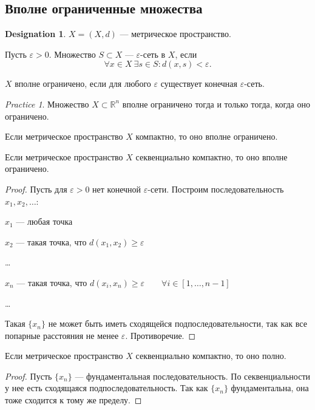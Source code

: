 \documentclass[11pt]{book}
\newcommand{\R}{\mathbb{R}}
\renewcommand{\ge}{\geqslant}
\theoremstyle{definition}
\theoremstyle{plain}
\theoremstyle{plain}
\theoremstyle{definition}
\newtheorem*{name}{Designation}
\theoremstyle{remark}
\newtheorem*{prac}{Practice}
\begin{document}
\subsection{Вполне ограниченные множества}
\begin{name}
    $ X = (X, d)$ --- метрическое пространство.
\end{name}
\begin{defn}
    Пусть $ \varepsilon >0$. Множество $ S \subset X$ --- $ \varepsilon $-сеть в $ X$, если
    \[
	\forall x \in X~ \exists s \in S: d(x, s)< \varepsilon
    .\]
\end{defn}
\begin{defn}
    $ X$ вполне ограничено, если для любого  $ \varepsilon $ существует конечная $ \varepsilon $-сеть.
\end{defn}
\begin{prac}
    Множество $ X \subset \R^{n} $ вполне ограничено тогда и только тогда, когда оно ограничено.
\end{prac}
\begin{thm}\label{th_comp_to_vpolne_ogran}
    Если метрическое пространство  $ X$ компактно, то оно вполне ограничено.
\end{thm}
\begin{thm}\label{th_sec_ogr}
    Если метрическое пространство $ X$ секвенциально компактно, то оно вполне ограничено.
\end{thm}
\begin{proof}
    Пусть для $ \varepsilon > 0$ нет конечной $\varepsilon$-сети.
    Построим последовательность $ x_1, x_2, \ldots $:
    \begin{description}
	\item $ x_1$ ---  любая точка
	\item $ x_2$ ---  такая точка, что  $ d(x_1, x_2) \ge \varepsilon $
	\item \ldots
	\item $ x_n$ --- такая точка, что  $ d(x_i, x_{n}) \ge \varepsilon \qquad \forall i \in [1, \ldots , n-1]$
	\item \ldots
    \end{description}
    Такая $ \{x_{n}\}$ не может быть иметь сходящейся подпоследовательности, так как все попарные расстояния не менее $ \varepsilon $. Противоречие.
\end{proof}
\begin{thm}\label{th_sec_poln}
    Если метрическое пространство $ X$ секвенциально компактно, то оно полно.
\end{thm}
\begin{proof}
    Пусть $ \{x_{n}\}$ --- фундаментальная последовательность. По секвенциальности у нее есть сходящаяся подпоследовательность. Так как $ \{x_{n}\}$ фундаментальна, она тоже сходится к тому же пределу.
\end{proof}
\end{document}
